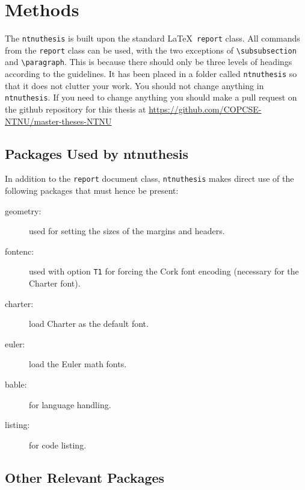\chapter{Methods}
\label{chap:methods}

The \texttt{ntnuthesis} is built upon the standard \LaTeX\
\texttt{report} class. All commands from the \texttt{report} class can
be used, with the two exceptions of \verb+\subsubsection+ and
\verb+\paragraph+. This is because there should only be three
levels of headings according to the guidelines. 
It has been placed in a folder called \texttt{ntnuthesis} so that it does not
clutter your work.  You should not change anything in \texttt{ntnuthesis}. If you need to change 
anything you should make a pull request on the github repository for this thesis at
\url{https://github.com/COPCSE-NTNU/master-theses-NTNU}

\section{Packages Used by ntnuthesis}
\label{sec:packages}

In addition to the \texttt{report} document class,
\texttt{ntnuthesis} makes direct use of the following packages
that must hence be present:
\begin{description}
	\item[geometry:] used for setting the sizes of the margins and
  	headers.
	\item[fontenc:] used with option \texttt{T1} for forcing the Cork font
  	encoding (necessary for the Charter font).
	\item[charter:] load Charter as the default font.
	\item[euler:] load the Euler math fonts.
	\item[bable:] for language handling.
	\item[listing:] for code listing.
\end{description}

\section{Other Relevant Packages}
\label{sec:otherpackages}

